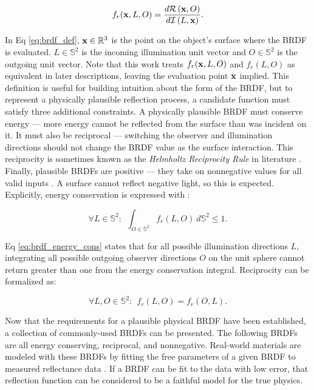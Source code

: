 \begin{equation} \label{eq:brdf_def}
    f_r(\mathbf{x}, L, O) = \frac{d\mathcal{R}\left(\mathbf{x}, O\right)}{d\mathcal{I}\left(L, \mathbf{x}\right)}.
\end{equation}

In Eq \ref{eq:brdf_def}, $\mathbf{x} \in \mathbb{R}^3$ is the point on the object's surface where the BRDF is evaluated. $L \in \mathbb{S}^2$ is the incoming illumination unit vector and $O \in \mathbb{S}^2$ is the outgoing unit vector. Note that this work treats $f_r(\mathbf{x}, L, O)$ and $f_r(L, O)$ as equivalent in later descriptions, leaving the evaluation point $\mathbf{x}$ implied. This definition is useful for building intuition about the form of the BRDF, but to represent a physically plausible reflection process, a candidate function must satisfy three additional constraints. A physically plausible BRDF must conserve energy --- more energy cannot be reflected from the surface than was incident on it. It must also be reciprocal --- switching the observer and illumination directions should not change the BRDF value as the surface interaction. This reciprocity is sometimes known as the \textit{Helmholtz Reciprocity Rule} in literature \cite{montes2012}. Finally, plausible BRDFs are positive --- they take on nonnegative values for all valid inputs \cite{montes2012}. A surface cannot reflect negative light, so this is expected. Explicitly, energy conservation is expressed with \cite{montes2012}:

\begin{equation} \label{eq:brdf_energy_cons}
  \forall L \in \mathbb{S}^2 : \:\: \int_{O \in \mathbb{S}^2} f_r(L, O) \: d\mathbb{S}^2 \leq 1.
\end{equation}

Eq \ref{eq:brdf_energy_cons} states that for all possible illumination directions $L$, integrating all possible outgoing observer directions $O$ on the unit sphere cannot return greater than one from the energy conservation integral. Reciprocity can be formalized as:

\begin{equation} \label{eq:brdf_reciprocity}
  \forall L, O \in \mathbb{S}^2 : \:\: f_r(L, O) = f_r(O, L).
\end{equation}

Now that the requirements for a plausible physical BRDF have been established, a collection of commonly-used BRDFs can be presented. The following BRDFs are all energy conserving, reciprocal, and nonnegative. Real-world materials are modeled with these BRDFs by fitting the free parameters of a given BRDF to measured reflectance data \cite{matusik2003}. If a BRDF can be fit to the data with low error, that reflection function can be considered to be a faithful model for the true physics. 

